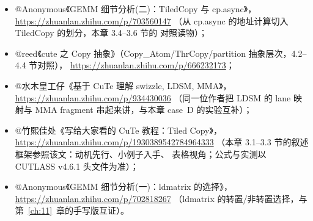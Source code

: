 \begin{itemize}
  \item @Anonymous《GEMM 细节分析(二)：TiledCopy 与 cp.async》，
        \url{https://zhuanlan.zhihu.com/p/703560147}
        （从 cp.async 的地址计算切入 TiledCopy 的划分，本章 3.4--3.6 节的
        对照读物）；
  \item @reed《cute 之 Copy 抽象》（Copy\_Atom/ThrCopy/partition
        抽象层次，4.2--4.4 节对照），
        \url{https://zhuanlan.zhihu.com/p/666232173}；
  \item @水木皇工仔《基于 CuTe 理解 swizzle, LDSM, MMA》，
        \url{https://zhuanlan.zhihu.com/p/934430036}
        （同一位作者把 LDSM 的 lane 映射与 MMA fragment 串起来讲，与本章
        case~D 的实验互补）；
  \item @竹熙佳处《写给大家看的 CuTe 教程：Tiled Copy》，
        \url{https://zhuanlan.zhihu.com/p/1930389542784964333}
        （本章 3.1--3.3 节的叙述框架参照该文：动机先行、小例子入手、
        表格视角；公式与实测以 CUTLASS v4.6.1 头文件为准）；
  \item @Anonymous《GEMM 细节分析(一)：ldmatrix 的选择》，
        \url{https://zhuanlan.zhihu.com/p/702818267}
        （ldmatrix 的转置/非转置选择，与第~\ref{ch:11}~章的手写版互证）。
\end{itemize}
